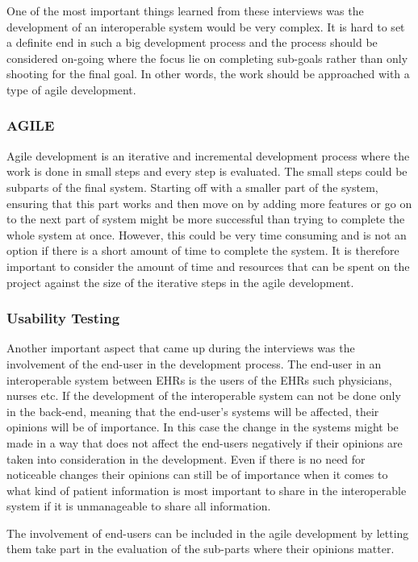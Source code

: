 \documentclass[14pt]{article}
\begin{document}
One of the most important things learned from these interviews was the development of an interoperable system would be very complex. It is hard to set a definite end in such a big development process and the process should be considered on-going where the focus lie on completing sub-goals rather than only shooting for the final goal. In other words, the work should be approached with a type of agile development. 

\subsubsection{AGILE}
Agile development is an iterative and incremental development process where the work is done in small steps and every step is evaluated. The small steps could be subparts of the final system. Starting off with a smaller part of the system, ensuring that this part works and then move on by adding more features or go on to the next part of system might be more successful than trying to complete the whole system at once. However, this could be very time consuming and is not an option if there is a short amount of time to complete the system. It is therefore important to consider the amount of time and resources that can be spent on the project against the size of the iterative steps in the agile development.

\subsubsection{Usability Testing}
\label{sec:resultsUsabilityTesting}
Another important aspect that came up during the interviews was the involvement of the end-user in the development process. The end-user in an interoperable system between \glspl{EHR} is the users of the \glspl{EHR} such physicians, nurses etc. If the development of the interoperable system can not be done only in the back-end, meaning that the end-user's systems will be affected, their opinions will be of importance. In this case the change in the systems might be made in a way that does not affect the end-users negatively if their opinions are taken into consideration in the development. Even if there is no need for noticeable changes their opinions can still be of importance when it comes to what kind of patient information is most important to share in the interoperable system if it is unmanageable to share all information. 

The involvement of end-users can be included in the agile development by letting them take part in the evaluation of the sub-parts where their opinions matter. 
\end{document}
